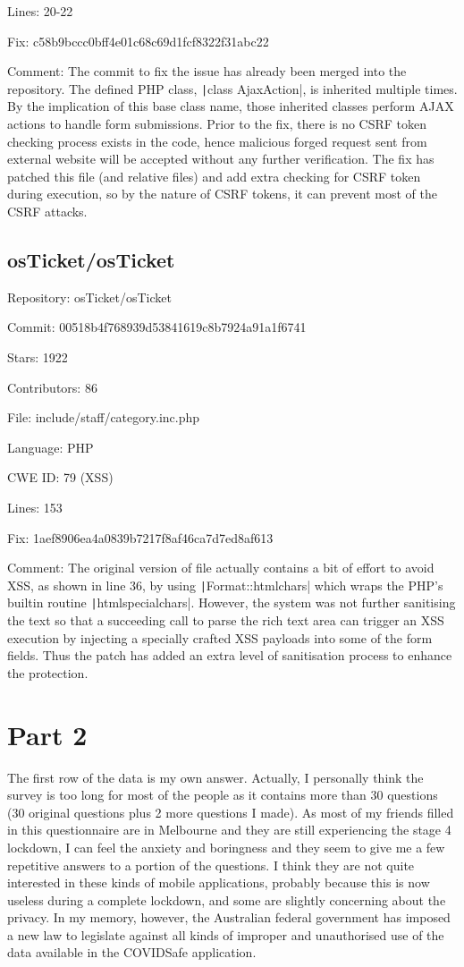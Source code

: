 \documentclass[12pt]{article}
\begin{document}
Lines: 20-22

Fix: c58b9bccc0bff4e01c68c69d1fcf8322f31abc22

Comment: The commit to fix the issue has already been merged into the repository. The defined PHP class, \texttt|class AjaxAction|, is inherited multiple times. By the implication of this base class name, those inherited classes perform AJAX actions to handle form submissions. Prior to the fix, there is no CSRF token checking process exists in the code, hence malicious forged request sent from external website will be accepted without any further verification. The fix has patched this file (and relative files) and add extra checking for CSRF token during execution, so by the nature of CSRF tokens, it can prevent most of the CSRF attacks.

\subsection{osTicket/osTicket}

Repository: osTicket/osTicket

Commit: 00518b4f768939d53841619c8b7924a91a1f6741

Stars: 1922

Contributors: 86

File: include/staff/category.inc.php

Language: PHP

CWE ID: 79 (XSS)

Lines: 153

Fix: 1aef8906ea4a0839b7217f8af46ca7d7ed8af613

Comment: The original version of file actually contains a bit of effort to avoid XSS, as shown in line 36, by using \texttt|Format::htmlchars| which wraps the PHP's builtin routine \texttt|htmlspecialchars|. However, the system was not further sanitising the text so that a succeeding call to parse the rich text area can trigger an XSS execution by injecting a specially crafted XSS payloads into some of the form fields. Thus the patch has added an extra level of sanitisation process to enhance the protection.

\section{Part 2}

The first row of the data is my own answer. Actually, I personally think the survey is too long for most of the people as it contains more than 30 questions (30 original questions plus 2 more questions I made). As most of my friends filled in this questionnaire are in Melbourne and they are still experiencing the stage 4 lockdown, I can feel the anxiety and boringness and they seem to give me a few repetitive answers to a portion of the questions. I think they are not quite interested in these kinds of mobile applications, probably because this is now useless during a complete lockdown, and some are slightly concerning about the privacy. In my memory, however, the Australian federal government has imposed a new law to legislate against all kinds of improper and unauthorised use of the data available in the COVIDSafe application.
\end{document}
